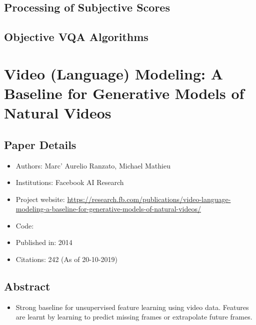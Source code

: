\documentclass{article}
\begin{document}
    \subsection{Processing of Subjective Scores}\label{subsec:Study_of_Subjective_and_Objective_Quality_Assessment_of_Video_(LIVE_VQA):processing-scores}

    \subsection{Objective VQA Algorithms}\label{subsec:Study_of_Subjective_and_Objective_Quality_Assessment_of_Video_(LIVE_VQA):obj-vqa}

    \newpage


    \section{Video (Language) Modeling: A Baseline for Generative Models of Natural Videos}\label{sec:Video_(Language)_Modeling_A_Baseline_for_Generative_Models_of_Natural_Videos}
    \subsection*{Paper Details}
    \begin{itemize}
        \item Authors: Marc' Aurelio Ranzato, Michael Mathieu
        \item Institutions: Facebook AI Research
        \item Project website: \url{https://research.fb.com/publications/video-language-modeling-a-baseline-for-generative-models-of-natural-videos/}
        \item Code:
        \item Published in: 2014
        \item Citations: 242 (As of 20-10-2019)
    \end{itemize}

    \subsection*{Abstract}
    \begin{itemize}
        \item Strong baseline for unsupervised feature learning using video data.
        Features are learnt by learning to predict missing frames or extrapolate future frames.
    \end{itemize}
\end{document}
